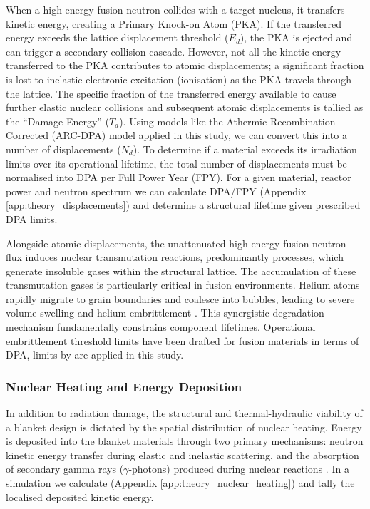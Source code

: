 \documentclass[11pt]{article}
\begin{document}
When a high-energy fusion neutron collides with a target nucleus, it transfers kinetic energy,
creating a Primary Knock-on Atom (PKA). If the transferred energy exceeds the lattice displacement
threshold ($E_d$), the PKA is ejected and can trigger a secondary collision cascade. However, not
all the kinetic energy transferred to the PKA contributes to atomic displacements; a significant
fraction is lost to inelastic electronic excitation (ionisation) as the PKA travels through the
lattice. The specific fraction of the transferred energy available to cause further elastic nuclear
collisions and subsequent atomic displacements is tallied as the ``Damage Energy'' ($T_d$). Using
models like the Athermic Recombination-Corrected (ARC-DPA) model \citep{nordlund2018improving}
applied in this study, we can convert this into a number of displacements ($N_d$). To determine if a
material exceeds its irradiation limits over its operational lifetime, the total number of
displacements must be normalised into DPA per Full Power Year (FPY). For a given material, reactor
power and neutron spectrum we can calculate DPA/FPY (Appendix \ref{app:theory_displacements}) and
determine a structural lifetime given prescribed DPA limits.

Alongside atomic displacements, the unattenuated high-energy fusion neutron flux induces nuclear
transmutation reactions, predominantly  processes, which generate insoluble
gases within the structural lattice. The accumulation of these transmutation gases is particularly
critical in fusion environments. Helium atoms rapidly migrate to grain boundaries and coalesce into
bubbles, leading to severe volume swelling and helium embrittlement \citep{trinkaus1985modeling}.
This synergistic degradation mechanism fundamentally constrains component lifetimes. Operational
embrittlement threshold limits have been drafted for fusion materials in terms of DPA, limits by
\cite{gilbert_integrated_2012} are applied in this study.

\subsubsection{Nuclear Heating and Energy Deposition}
In addition to radiation damage, the structural and thermal-hydraulic viability of a blanket design
is dictated by the spatial distribution of nuclear heating. Energy is deposited into the blanket
materials through two primary mechanisms: neutron kinetic energy transfer during elastic and
inelastic scattering, and the absorption of secondary gamma rays ($\gamma$-photons) produced during
nuclear reactions \citep{kuridan_neutron_2023}. In a simulation we calculate (Appendix
\ref{app:theory_nuclear_heating}) and tally the localised deposited kinetic energy.
\end{document}
